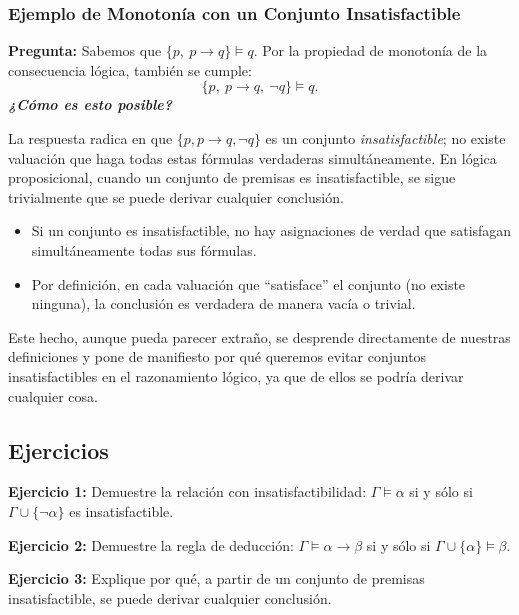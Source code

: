 \subsubsection*{Ejemplo de Monotonía con un Conjunto Insatisfactible}

\noindent\textbf{Pregunta:}\; Sabemos que $\{p,\ p \rightarrow q\} \models q$. Por la propiedad de monotonía de la consecuencia lógica, también se cumple:
\[
\{p,\ p \rightarrow q,\ \neg q\} \models q.
\]
\textbf{\emph{¿Cómo es esto posible?}}

La respuesta radica en que $\{p, p \rightarrow q, \neg q\}$ es un conjunto \emph{insatisfactible}; no existe valuación que haga todas estas fórmulas verdaderas simultáneamente. En lógica proposicional, cuando un conjunto de premisas es insatisfactible, se sigue trivialmente que se puede derivar cualquier conclusión.

\begin{itemize}
\item Si un conjunto es insatisfactible, no hay asignaciones de verdad que satisfagan simultáneamente todas sus fórmulas.
\item Por definición, en cada valuación que ``satisface'' el conjunto (no existe ninguna), la conclusión es verdadera de manera vacía o trivial.
\end{itemize}

Este hecho, aunque pueda parecer extraño, se desprende directamente de nuestras definiciones y pone de manifiesto por qué queremos evitar conjuntos insatisfactibles en el razonamiento lógico, ya que de ellos se podría derivar cualquier cosa.

\subsection{Ejercicios}

\textbf{Ejercicio 1:} Demuestre la relación con insatisfactibilidad: $\Gamma \models \alpha$ si y sólo si $\Gamma \cup \{\neg \alpha\}$ es insatisfactible.

\textbf{Ejercicio 2:} Demuestre la regla de deducción: $\Gamma \models \alpha \rightarrow \beta$ si y sólo si $\Gamma \cup \{\alpha\} \models \beta$.

\textbf{Ejercicio 3:} Explique por qué, a partir de un conjunto de premisas insatisfactible, se puede derivar cualquier conclusión.